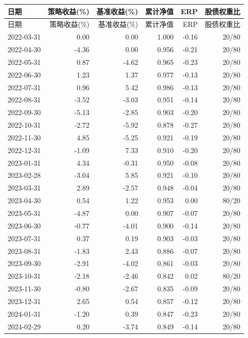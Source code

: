 
\begin{center}
\small  
\begin{longtable}{lrrrrr}
\toprule
日期 & 策略收益(\%) & 基准收益(\%) & 累计净值 & ERP & 股债权重比 \\
\midrule
\endfirsthead
\toprule
日期 & 策略收益(\%) & 基准收益(\%) & 累计净值 & ERP & 股债权重比 \\
\midrule
\endhead
2022-03-31 & 0.00 & 0.00 & 1.000 & -0.16 & 20/80 \\
2022-04-30 & -4.36 & 0.00 & 0.956 & -0.21 & 20/80 \\
2022-05-31 & 0.87 & -4.62 & 0.965 & -0.23 & 20/80 \\
2022-06-30 & 1.23 & 1.37 & 0.977 & -0.13 & 20/80 \\
2022-07-31 & 0.96 & 5.42 & 0.986 & -0.13 & 20/80 \\
2022-08-31 & -3.52 & -3.03 & 0.951 & -0.14 & 20/80 \\
2022-09-30 & -5.13 & -2.85 & 0.903 & -0.20 & 20/80 \\
2022-10-31 & -2.72 & -5.92 & 0.878 & -0.27 & 20/80 \\
2022-11-30 & 4.85 & -5.25 & 0.921 & -0.19 & 20/80 \\
2022-12-31 & -1.09 & 7.33 & 0.910 & -0.20 & 20/80 \\
2023-01-31 & 4.34 & -0.31 & 0.950 & -0.08 & 20/80 \\
2023-02-28 & -3.04 & 5.85 & 0.921 & -0.10 & 20/80 \\
2023-03-31 & 2.89 & -2.57 & 0.948 & -0.04 & 20/80 \\
2023-04-30 & 0.54 & 1.22 & 0.953 & 0.00 & 80/20 \\
2023-05-31 & -4.87 & 0.00 & 0.907 & -0.07 & 20/80 \\
2023-06-30 & -0.77 & -4.01 & 0.900 & -0.14 & 20/80 \\
2023-07-31 & 0.37 & 0.19 & 0.903 & -0.03 & 20/80 \\
2023-08-31 & -1.83 & 2.43 & 0.886 & -0.07 & 20/80 \\
2023-09-30 & -2.91 & -4.02 & 0.861 & -0.03 & 20/80 \\
2023-10-31 & -2.18 & -2.46 & 0.842 & 0.02 & 80/20 \\
2023-11-30 & -0.80 & -2.67 & 0.835 & -0.09 & 20/80 \\
2023-12-31 & 2.65 & 0.54 & 0.857 & -0.12 & 20/80 \\
2024-01-31 & -1.20 & 0.39 & 0.847 & -0.23 & 20/80 \\
2024-02-29 & 0.20 & -3.74 & 0.849 & -0.14 & 20/80 \\

\end{longtable}
\end{center}
